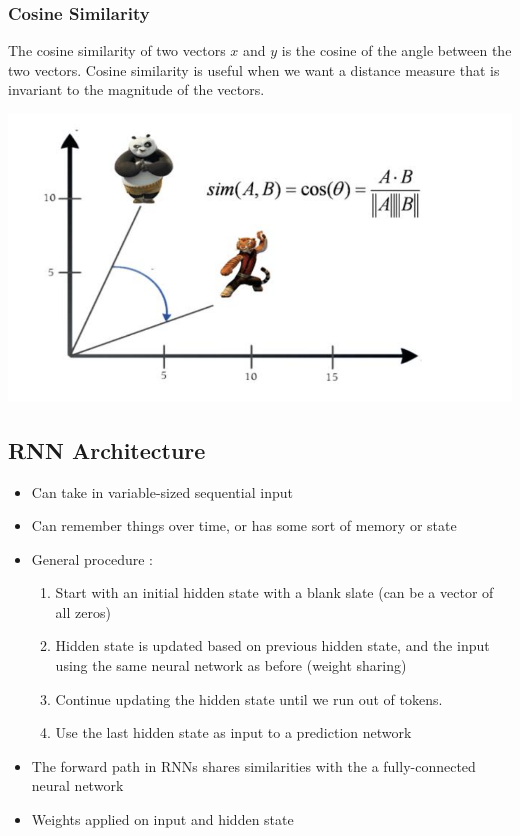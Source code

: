 \documentclass[11pt]{article}
\begin{document}
\subsubsection{Cosine Similarity}
The cosine similarity of two vectors $x$ and $y$ is the cosine of the angle between the two vectors.  Cosine similarity is useful when we want a distance measure that is invariant to the magnitude of the vectors.
\begin{center}
\includegraphics[scale=0.7]{images/cosine.png}
\end{center}

\subsection{RNN Architecture}
\begin{itemize}
\item Can take in variable-sized sequential input 
\item Can remember things over time, or has some sort of memory or state
\item General procedure :
\begin{enumerate}
\item Start with an initial hidden state with a blank slate (can be a vector of all zeros) 
\item Hidden state is updated based on previous hidden state, and the input using the same neural network as before (weight sharing)
\item Continue updating the hidden state until we run out of tokens.
\item Use the last hidden state as input to a prediction network
\end{enumerate}
\item The forward path in RNNs shares similarities with the a fully-connected neural network
\item Weights applied on input and hidden state
\end{itemize}
\end{document}
